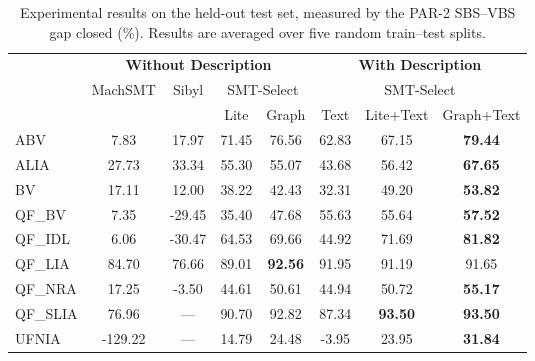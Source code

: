 \begin{table}[t]
\centering
\begin{tabular*}{\columnwidth}{@{\extracolsep{\fill}}@{}lccccccc@{}}
\toprule
 & \multicolumn{4}{c}{\textbf{Without Description}} & \multicolumn{3}{c}{\textbf{With Description}} \\
\cmidrule(lr){2-5}
\cmidrule(lr){6-8}
 & \multirow{2}{*}{MachSMT} & \multirow{2}{*}{Sibyl} & \multicolumn{2}{c}{SMT-Select} & \multicolumn{3}{c}{SMT-Select} \\
\cmidrule(lr){4-5}
\cmidrule(lr){6-8}
 &  &  & Lite & Graph & Text & Lite+Text & Graph+Text \\
\midrule
ABV & 7.83 & 17.97 & 71.45 & 76.56 & 62.83 & 67.15 & \textbf{79.44} \\
ALIA & 27.73 & 33.34 & 55.30 & 55.07 & 43.68 & 56.42 & \textbf{67.65} \\
BV & 17.11 & 12.00 & 38.22 & 42.43 & 32.31 & 49.20 & \textbf{53.82} \\
QF\_BV & 7.35 & -29.45 & 35.40 & 47.68 & 55.63 & 55.64 & \textbf{57.52} \\
QF\_IDL & 6.06 & -30.47 & 64.53 & 69.66 & 44.92 & 71.69 & \textbf{81.82} \\
QF\_LIA & 84.70 & 76.66 & 89.01 & \textbf{92.56} & 91.95 & 91.19 & 91.65 \\
QF\_NRA & 17.25 & -3.50 & 44.61 & 50.61 & 44.94 & 50.72 & \textbf{55.17} \\
QF\_SLIA & 76.96 & --- & 90.70 & 92.82 & 87.34 & \textbf{93.50} & \textbf{93.50} \\
UFNIA & -129.22 & --- & 14.79 & 24.48 & -3.95 & 23.95 & \textbf{31.84} \\
\bottomrule
\end{tabular*}
\caption{Experimental results on the held-out test set, measured by the PAR-2 SBS--VBS gap closed (\%). Results are averaged over five random train--test splits.}
\label{tab:final_par2}
\end{table}
